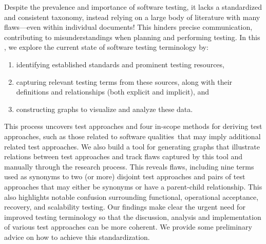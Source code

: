 \label{abstract}%
Despite the prevalence and importance of software testing, it lacks
a standardized and consistent taxonomy, instead relying on a large body of
literature with many flaws---even within individual documents! This hinders
precise communication, contributing to misunderstandings when planning and
performing testing. In this \docType{}, we %
explore the current state of software testing terminology by:
\begin{enumerate}
    \item identifying established standards and prominent testing resources,
    \item capturing relevant testing terms from these sources, along with their
          definitions and relationships (both explicit and implicit), and
    \item constructing graphs to visualize and analyze these data.
\end{enumerate}
This process uncovers \approachCount{} test approaches and
\ifnotpaper four in-scope methods for deriving test approaches, such as those
    related to \fi \qualityCount{} software qualities\ifnotpaper\else\ that may
    imply additional related test approaches\fi. We also build
a tool for generating graphs that illustrate relations between test
approaches and track flaws captured by this tool and manually through
the research process. This reveals \discrepCount{} flaws,
including nine terms used as synonyms to two (or more) disjoint test approaches
and \parSynCount{} pairs of test approaches that may either be synonyms or have
a parent-child relationship. This also highlights notable confusion surrounding
functional, operational acceptance, recovery, and scalability testing. Our
findings make clear the urgent need for improved testing terminology so that
the discussion, analysis and implementation of various test approaches can be
more coherent. We provide some preliminary advice on how to achieve this
standardization.